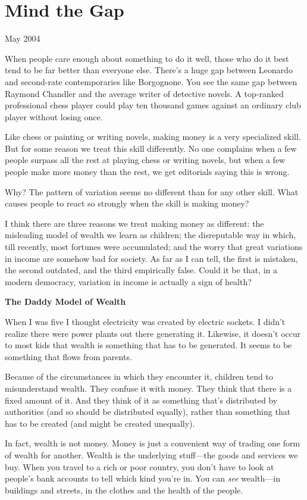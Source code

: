 \chapter{Mind the Gap}

May 2004

When people care enough about something to do it well, those who do it
best tend to be far better than everyone else. There's a huge gap
between Leonardo and second-rate contemporaries like Borgognone. You see
the same gap between Raymond Chandler and the average writer of
detective novels. A top-ranked professional chess player could play ten
thousand games against an ordinary club player without losing once.

Like chess or painting or writing novels, making money is a very
specialized skill. But for some reason we treat this skill differently.
No one complains when a few people surpass all the rest at playing chess
or writing novels, but when a few people make more money than the rest,
we get editorials saying this is wrong.

Why? The pattern of variation seems no different than for any other
skill. What causes people to react so strongly when the skill is making
money?

I think there are three reasons we treat making money as different: the
misleading model of wealth we learn as children; the disreputable way in
which, till recently, most fortunes were accumulated; and the worry that
great variations in income are somehow bad for society. As far as I can
tell, the first is mistaken, the second outdated, and the third
empirically false. Could it be that, in a modern democracy, variation in
income is actually a sign of health?

\textbf{The Daddy Model of Wealth}

When I was five I thought electricity was created by electric sockets. I
didn't realize there were power plants out there generating it.
Likewise, it doesn't occur to most kids that wealth is something that
has to be generated. It seems to be something that flows from parents.

Because of the circumstances in which they encounter it, children tend
to misunderstand wealth. They confuse it with money. They think that
there is a fixed amount of it. And they think of it as something that's
distributed by authorities (and so should be distributed equally),
rather than something that has to be created (and might be created
unequally).

In fact, wealth is not money. Money is just a convenient way of trading
one form of wealth for another. Wealth is the underlying stuff---the
goods and services we buy. When you travel to a rich or poor country,
you don't have to look at people's bank accounts to tell which kind
you're in. You can \emph{see} wealth---in buildings and streets, in the
clothes and the health of the people.

